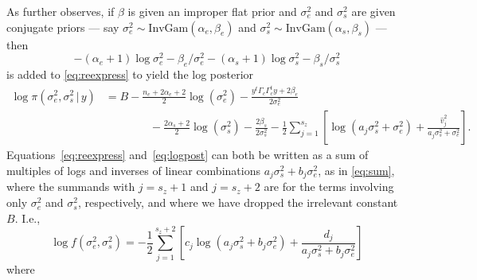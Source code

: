 \documentclass{report}
\newcommand{\IG}{\text{InvGam}}
\newcommand{\RL}{f}
\newcommand{\logRL}{\log\RL}
\newcommand{\sigssq}{\sigma_s^2}
\newcommand{\sigesq}{\sigma_e^2}
\newcommand{\logRLss}{\logRL(\sigesq,\sigssq)}
\newcommand{\ass}{a_j\sigssq + \sigesq}
\newcommand{\abss}{a_j\sigssq + b_j\sigesq}
\newcommand{\g}{\,|\,}
\begin{document}
As \cite{hodges:2013} further observes, if $\beta$ is given an improper flat prior and $\sigesq$ and $\sigssq$ are given conjugate priors --- say $\sigesq \sim \IG(\alpha_e,\beta_e)$ and $\sigssq \sim \IG(\alpha_s,\beta_s)$ --- then \begin{equation*}
  -(\alpha_e+1) \log\sigesq - \beta_e/\sigesq -(\alpha_s+1) \log\sigssq - \beta_s/\sigssq
\end{equation*}
is added to \eqref{eq:reexpress} to yield
the log posterior
\begin{equation}
\label{eq:logpost}
  \begin{split}
  \log\pi(\sigesq,\sigssq\g y) &=
  B - \frac{n_e + 2\alpha_e + 2}{2}\log(\sigesq) -
    \frac{y^t \Gamma_c \Gamma^t_c y + 2\beta_e}{2\sigesq}\\
    &\qquad\qquad - \frac{2\alpha_s + 2} {2}\log(\sigssq) - \frac{2\beta_s}{2\sigssq}
    - \frac{1}{2} \sum_{j=1}^{s_z} \left[ \log(\ass) + \frac{\hat v_j^2}{\ass}\right].
  \end{split}
\end{equation}
Equations~\eqref{eq:reexpress} and~\eqref{eq:logpost} can both be written as a sum of multiples of logs and inverses of linear combinations $\abss$, as in \eqref{eq:sum}, where the summands with $j=s_z+1$ and $j=s_z+2$ are for the terms involving only $\sigesq$ and $\sigssq$, respectively, and where we have dropped the irrelevant constant $B$.  I.e.,
\begin{equation}
\label{eq:sum}
  \logRLss = -\frac{1}{2} \sum_{j=1}^{s_z+2}\left[ c_j \log(\abss) + \frac{d_j}{\abss}\right]
\end{equation}
where
\end{document}
